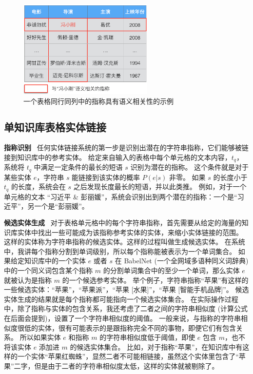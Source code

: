 \begin{figure}[htbp]
\centering
\includegraphics[width=0.6\textwidth]{img/table}
\caption{一个表格同行同列中的指称具有语义相关性的示例}
\label{table}
\end{figure}

\subsection{单知识库表格实体链接}\label{single}

\noindent\textbf{指称识别} \ 
任何实体链接系统的第一步是识别出潜在的字符串指称，它们能够被链接到知识库中的参考实体。
给定来自输入的表格中每个单元格的文本内容，$t_q$，系统将 $t_q$ 中满足一定条件的最长的短语 $s$ 识别为潜在的指称。
这个条件就是对于某些实体 $e$，字符串 $s$ 能链接到该实体的概率 $P(e|s)$ 非零。
如果 $s$ 的长度小于 $t_q$ 的长度，系统会在 $s$ 之后发现长度最长的短语，并以此类推。
例如，对于一个单元格的文本 ``习近平 \& 彭丽媛''，系统会识别出到两个潜在的指称：一个是``习近平''，另一个是``彭丽媛''。\newline


\noindent\textbf{候选实体生成} \ 
对于表格单元格中的每个字符串指称，首先需要从给定的海量的知识库实体中找出一些可能成为该指称参考实体的实体，来缩小实体链接的范围。
这样的实体称为字符串指称的候选实体。这样的过程叫做生成候选实体。
在系统中，我讲每个指称分割到单词级别，所以每个指称能被表示为一个单词集合。
如果给定知识库中的一个实体 $e$ 或者 $s$ 在 BabelNet\cite{navigli2010babelnet} (一个全网域多语种同义词辞典) 中的一个同义词包含某个指称 $m$ 的分割单词集合中的至少一个单词，那么实体 $e$ 就被认为是指称 $m$ 的一个候选参考实体。
举个例子，字符串指称``苹果''有这样的一些候选实体：``苹果''，``苹果派''，``苹果 [水果]''，``苹果 [智能手机品牌]''。
候选实体生成的结果就是每个指称都可能指向一个候选实体集合。
在实际操作过程中，除了指称与实体的包含关系，我还考虑了二者之间的字符串相似度 (计算公式在后面会提到)，设置了一个字符串相似度的阈值。
一般来说，与指称的字符串相似度很低的实体，很有可能表示的是跟指称完全不同的事物，即便它们有包含关系。
所以如果实体 $e$ 和指称 $m$ 的字符串相似度低于阈值，即使 $e$ 包含 $m$，也不将该实体 $e$ 添加进 $m$ 的候选实体集合。
比如，对于指称``苹果''，在知识库中有这样的一个实体``苹果红蜘蛛''，显然二者不可能相链接，虽然这个实体里包含了``苹果''二字，但是由于二者的字符串相似度太低，这样的实体就被剔除了。
\newline

